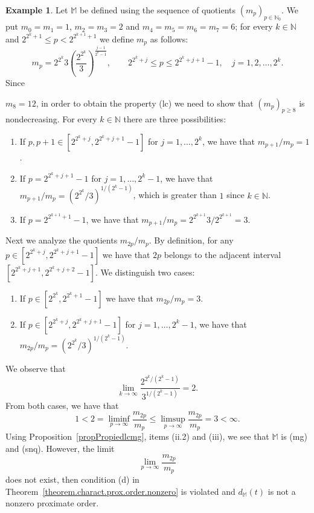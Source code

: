 \documentclass[11pt,a4paper]{article}
\theoremstyle{definition}
\newtheorem{exam}[theo]{Example}
\def\oo{\infty}
\def\ri{\rightarrow}
\def\N{\mathbb{N}}
\def\M{\mathbb{M}}
\begin{document}
\begin{exam}\label{example.dM.not.p.o}
Let $\M$ be defined using the sequence of  quotients
$(m_p)_{p\in \N_0}$. We put $m_0=m_1=1$, $m_2=m_3=2$ and $m_4=m_5=m_6=m_7=6$; for every $k\in\N$ and $2^{2^k+1}\leq p <2^{2^{k+1}+1}$ we
define $m_p$ as follows:
$$m_p= 2^{2^k} 3\left(\frac{2^{2^k}}{3}\right)^{\frac{j-1}{2^k-1}},  \qquad 2^{2^k+j}\le p\le 2^{2^k+j+1}-1,\quad
j=1,2,\dots, 2^k.$$
Since

$m_8=12$, in order to obtain the property (lc) we need to show
that $(m_p)_{p\geq 8}$ is nondecreasing. For every $k\in\N$
there are three possibilities:
\begin{enumerate}
 \item If $p,p+1\in[2^{2^k+j},2^{2^k+j+1}-1 ]$ for $j=1,\dots,2^k$, we have that $m_{p+1}/m_p=1$.
 \item If $p=2^{2^k+j+1}-1$ for $j=1,\dots,2^k-1$,  we have that $m_{p+1}/m_p=(2^{2^k}/3)^{1/(2^k-1)}$, which is greater
 than $1$ since $k\in\N$.
 \item If $p=2^{2^{k+1}+1}-1$, we have that $m_{p+1}/m_p= 2^{2^{k+1}} 3/ 2^{2^{k+1}} =3$.
\end{enumerate}


Next we analyze the quotients $m_{2p}/m_p$. By definition, for any  $p\in [2^{2^k+j},2^{2^k+j+1}-1]$
we have that $2p$ belongs to the adjacent interval $[2^{2^k+j+1},2^{2^k+j+2}-1]$. We distinguish two cases:
\begin{enumerate}
 \item If $p \in[2^{2^k},2^{2^k+1}-1 ]$ we have that $m_{2p}/m_p= 3$.
 \item If $p\in [2^{2^k+j},2^{2^k+j+1}-1 ] $ for $j=1,\dots,2^k-1$,  we have that
 $m_{2p}/m_p=(2^{2^k}/3)^{1/(2^k-1)}$.
\end{enumerate}
We observe that
 $$\lim_{k\ri\oo} \frac{2^{2^k/(2^k-1)}}{3^{1/(2^k-1)}}=2.$$
From both cases, we have that
$$ 1<2=\liminf_{p\ri\oo}\frac{m_{2p}}{m_p} \leq \limsup_{p\ri\oo}\frac{m_{2p}}{m_p}=3<\oo.$$
Using Proposition~\ref{propPropiedlcmg}, items (ii.2) and (iii), we see that $\M$ is (mg) and (snq). However, the limit
$$\lim_{p\ri\oo}\frac{m_{2p}}{m_p}$$
does not exist, then condition (d) in Theorem~\ref{theorem.charact.prox.order.nonzero} is violated and
$d_{\M}(t)$ is not a nonzero proximate order.


\end{exam}
\end{document}
